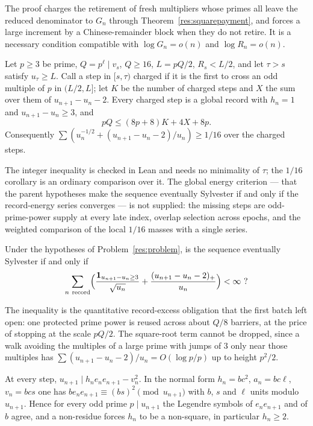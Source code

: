 The proof charges the retirement of fresh multipliers whose primes all leave the
reduced denominator to $G_n$ through Theorem~\ref{res:squarepayment}, and forces
a large increment by a Chinese-remainder block when they do not retire.  It is a
necessary condition compatible with $\log G_n=o(n)$ and $\log R_n=o(n)$.

\begin{theorem}\label{res:epoch}
Let $p\ge3$ be prime, $Q=p^{\ell}\mid v_s$, $Q\ge16$, $L=pQ/2$, $R_s<L/2$, and
let $\tau>s$ satisfy $u_\tau\ge L$.  Call a step in $[s,\tau)$ charged if it is
the first to cross an odd multiple of $p$ in $(L/2,L]$; let $K$ be the number of
charged steps and $X$ the sum over them of $u_{n+1}-u_n-2$.  Every charged step
is a global record with $h_n=1$ and $u_{n+1}-u_n\ge3$, and
\[
 pQ\le(8p+8)K+4X+8p .
\]
Consequently $\sum(u_n^{-1/2}+(u_{n+1}-u_n-2)/u_n)\ge1/16$ over the charged
steps.
\end{theorem}

The integer inequality is checked in Lean and needs no minimality of $\tau$;
the $1/16$ corollary is an ordinary comparison over it.  The global energy
criterion --- that the parent hypotheses make the sequence eventually
Sylvester if and only if the record-energy series converges --- is not
supplied: the missing steps are odd-prime-power supply at every late index,
overlap selection across epochs, and the weighted comparison of the local
$1/16$ masses with a single series.

\begin{problem}\label{res:epochglobal}
Under the hypotheses of Problem~\ref{res:problem}, is the sequence eventually
Sylvester if and only if
\[
 \sum_{n\ \text{record}}\Bigl(\frac{\mathbf 1_{u_{n+1}-u_n\ge3}}{\sqrt{u_n}}
 +\frac{(u_{n+1}-u_n-2)_+}{u_n}\Bigr)<\infty\ ?
\]
\end{problem}

The inequality is the quantitative record-excess obligation that the first
batch left open: one protected prime power is reused across about $Q/8$
barriers, at the price of stopping at the scale $pQ/2$.  The square-root term
cannot be dropped, since a walk avoiding the multiples of a large prime with
jumps of $3$ only near those multiples has $\sum(u_{n+1}-u_n-2)/u_n=O(\log p/p)$
up to height $p^2/2$.

\begin{theorem}\label{res:saturated}
At every step, $u_{n+1}\mid h_ne_ne_{n+1}-v_n^2$.  In the normal form
$h_n=bc^2$, $a_n=bc\ell$, $v_n=bcs$ one has
$be_ne_{n+1}\equiv(bs)^2\pmod{u_{n+1}}$ with $b$, $s$ and $\ell$ units modulo
$u_{n+1}$.  Hence for every odd prime $p\mid u_{n+1}$ the Legendre symbols of
$e_ne_{n+1}$ and of $b$ agree, and a non-residue forces $h_n$ to be a
non-square, in particular $h_n\ge2$.
\end{theorem}

